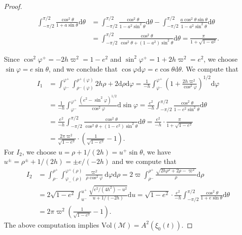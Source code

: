 \documentclass[10pt,a4paper]{amsart}
\newcommand{\om}{\varpi}
\begin{document}
\begin{proof}
\begin{equation}
\begin{aligned}
		\end{aligned}
	\end{equation}
	\begin{equation} \label{formula 2} \begin{aligned}
	\int_{-\pi\slash2}^{\pi\slash2}\frac{\cos^2\theta}{1+a\sin\theta}\mathrm{d} \theta&=\int_{-\pi\slash2}^{\pi\slash2}\frac{\cos^2\theta}{1-a^2\sin^{2}\theta}\mathrm{d} \theta-\int_{-\pi\slash2}^{\pi\slash2}\frac{a\cos^2\theta\sin\theta}{1-a^2\sin^{2}\theta}\mathrm{d} \theta\\
			&=\int_{-\pi\slash2}^{\pi\slash2}\frac{\cos^2\theta}{\cos^{2}\theta+(1-a^2)\sin^{2}\theta}\mathrm{d} \theta=\frac{\pi}{1+\sqrt{1-a^2}}.
	\end{aligned}		
	\end{equation}

	Since $\cos^2\varphi^+=-2h\om^2=1-e^2$ and $\sin^2\varphi^+=1+2h\om^2=e^2$, we choose $\sin\varphi=e\sin\theta$, and we conclude that $\cos\varphi\mathrm{d}\varphi=e\cos\theta\mathrm{d}\theta$. We compute that
	$$
	\begin{aligned}
		I_1&=\int_{\varphi^-}^{\varphi^+}\int_{\rho^-(\varphi)}^{\rho^+(\varphi)}2h\rho+2 \mathrm{d}\rho \mathrm{d}\varphi=\frac{1}{-h}\int_{\varphi^-}^{\varphi^+}\left(1+\frac{2h\om^{2}}{\cos^2\varphi}\right)^{1/2}\mathrm{d} \varphi\\
		&=\frac{1}{-h}\int_{\varphi^-}^{\varphi^+}\frac{(e^2-\sin^{2}\varphi)^{1/2}}{\cos^2\varphi}\mathrm{d}\sin \varphi=\frac{e^2}{-h}\int_{-\pi/2}^{\pi/2}\frac{\cos^{2}\theta}{1-e^2\sin^2\theta}\mathrm{d} \theta\\
		&=\frac{e^2}{-h}\int_{-\pi\slash2}^{\pi\slash2}\frac{\cos^2\theta}{\cos^2\theta+(1-e^2)\sin^{2}\theta}\mathrm{d} \theta=\frac{e^2}{-h}\cdot\frac{\pi}{1+\sqrt{1-e^2}}\\
		&=\frac{2\pi\om^2}{\sqrt{1-e^2}}\cdot\left(\frac{1}{\sqrt{1-e^{2}}}-1\right). 
	\end{aligned}$$
	For $I_2$, we choose $u=\rho+1/(2h)=u^+\sin\theta$, we have $u^\pm=\rho^\pm+1/(2h)=\pm e/(-2h)$ and we compute that 
	$$
	\begin{aligned}
		I_2&=\int_{\rho^-}^{\rho^+}\int_{\varphi_-(\rho)}^{\varphi^+(\rho)}\frac{\om^2}{\rho\cos^2\varphi} \mathrm{d}\varphi \mathrm{d}\rho=2\om\int_{\rho^-}^{\rho^+}\frac{\sqrt{2h\rho^2+2\rho-\om^{2}}}{\rho}\mathrm{d} \rho\\    &=2\sqrt{1-e^2}\int_{u^-}^{u^+}\frac{\sqrt{e^2/(4h^2)-u^{2}}}{u+1/(-2h)}\mathrm{d} u=\sqrt{1-e^2}\cdot\frac{e^2}{-h}\int_{-\pi\slash2}^{\pi\slash2}\frac{\cos^2\theta}{1+e\sin\theta}\mathrm{d} \theta\\
		&=2\pi\om^2\left(\frac{1}{\sqrt{1-e^{2}}}-1\right).
	\end{aligned}$$
	The above computation implies $\text{Vol}(\mathcal{M}) =A^2(\xi_0(t))$. 
\end{proof}
\end{document}
